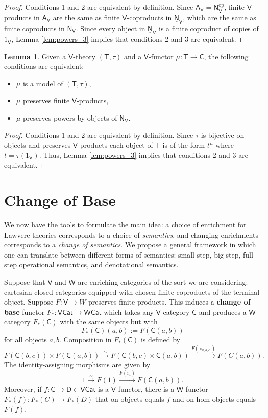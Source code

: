 \documentclass{amsart}
\theoremstyle{definition}
\newtheorem{lemma}[theorem]{Lemma}
\newcommand{\Cat}{\mathsf{Cat}}
\newcommand{\NN}{\mathsf{N}}
\newcommand{\A}{\mathsf{A}}
\newcommand{\V}{\mathsf{V}}
\newcommand{\W}{\mathsf{W}}
\newcommand{\D}{\mathsf{D}}
\newcommand{\C}{\mathsf{C}}
\newcommand{\T}{\mathsf{T}}
\newcommand{\op}{\mathrm{op}}
\newcommand{\maps}{\colon}
\begin{document}
\begin{proof} Conditions 1 and 2 are equivalent by definition.
Since $\A_\V = \underline{\NN}_\V^\op$, finite $\V$-products in $\A_\V$ are 
the same as finite $\V$-coproducts in $\underline{\NN}_\V$, which are the same as 
finite coproducts in $\NN_\V$.   Since every object in $\underline{\NN}_\V$ is a 
finite coproduct of copies of $1_\V$, Lemma \ref{lem:powers_3} implies that conditions
2 and 3 are equivalent.
\end{proof}

\begin{lemma}
\label{lem:powers_5}
Given a $\V$-theory $(\T,\tau)$ and a $\V$-functor $\mu \maps \T \to \C$,
the following conditions are equivalent:
\begin{itemize}
\item $\mu$ is a model of $(\T,\tau)$,
\item $\mu$ preserves finite $\V$-products,
\item $\mu$ preserves powers by objects of $\NN_\V$.
\end{itemize}
\end{lemma}

\begin{proof}
Conditions 1 and 2 are equivalent by definition.   Since $\tau$ is bijective on 
objects and preserves $\V$-products each object of $\T$ is of the form $t^n$ 
where $t = \tau(1_\V)$.   Thus, Lemma \ref{lem:powers_3} implies that
conditions 2 and 3 are equivalent.
\end{proof}

\section{Change of Base}
\label{sec:base_change}

We now have the tools to formulate the main idea: a choice of enrichment for Lawvere theories corresponds to a choice of \textit{semantics}, and changing enrichments corresponds to a \textit{change of semantics}. We propose a general framework in which one can translate between different forms of semantics: small-step, big-step, full-step operational semantics, and denotational semantics.

Suppose that $\V$ and $\W$ are enriching categories of the sort we are considering: 
cartesian closed categories equipped with chosen finite coproducts of the terminal object.
Suppose $F \maps \V \to W$ preserves finite products.   This induces a \textbf{change of base} functor $F_*\maps\V\Cat \to \W\Cat$ \cite{borceux} which takes any $\V$-category $\C$ and produces a $\W$-category $F_*(\C)$ with the same objects but with
\[      F_*(\C)(a,b) := F(\C(a,b)) \]
for all objects $a,b$.   Composition in $F_*(\C)$ is defined by
\[       F(\C(b,c)) \times F(\C(a,b)) \stackrel{\sim}{\longrightarrow} F(\C(b,c) \times \C(a,b)) 
\stackrel{F(\circ_{a,b,c})}{\longrightarrow} F(C(a,b)) . \]  
The identity-assigning morphisms are given by
\[          1 \stackrel{\sim}{\longrightarrow} F(1) \stackrel{F(i_a)}{\longrightarrow}
F(\C(a,b)) .\]
Moreover, if $f\maps \C \to \D \in \V\Cat$ is a $\V$-functor, there is a $\W$-functor $F_*(f) \maps F_*(C) \to F_*(D)$ that on objects equals $f$ and on hom-objects equals $F(f)$.   
\end{document}
